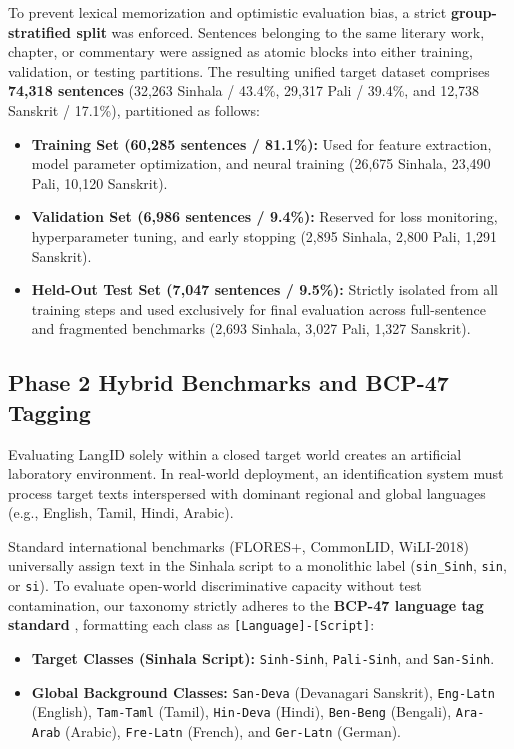\documentclass[11pt]{article}
\begin{document}
To prevent lexical memorization and optimistic evaluation bias, a strict \textbf{group-stratified split} was enforced. Sentences belonging to the same literary work, chapter, or commentary were assigned as atomic blocks into either training, validation, or testing partitions. The resulting unified target dataset comprises \textbf{74,318 sentences} (32,263 Sinhala / 43.4\%, 29,317 Pali / 39.4\%, and 12,738 Sanskrit / 17.1\%), partitioned as follows:
\begin{itemize}
    \item \textbf{Training Set (60,285 sentences / 81.1\%):} Used for feature extraction, model parameter optimization, and neural training (26,675 Sinhala, 23,490 Pali, 10,120 Sanskrit).
    \item \textbf{Validation Set (6,986 sentences / 9.4\%):} Reserved for loss monitoring, hyperparameter tuning, and early stopping (2,895 Sinhala, 2,800 Pali, 1,291 Sanskrit).
    \item \textbf{Held-Out Test Set (7,047 sentences / 9.5\%):} Strictly isolated from all training steps and used exclusively for final evaluation across full-sentence and fragmented benchmarks (2,693 Sinhala, 3,027 Pali, 1,327 Sanskrit).
\end{itemize}

\subsection{Phase 2 Hybrid Benchmarks and BCP-47 Tagging}
Evaluating LangID solely within a closed target world creates an artificial laboratory environment. In real-world deployment, an identification system must process target texts interspersed with dominant regional and global languages (e.g., English, Tamil, Hindi, Arabic).

Standard international benchmarks (FLORES+, CommonLID, WiLI-2018) universally assign text in the Sinhala script to a monolithic label (\texttt{sin\_Sinh}, \texttt{sin}, or \texttt{si}). To evaluate open-world discriminative capacity without test contamination, our taxonomy strictly adheres to the \textbf{BCP-47 language tag standard} \cite{phillips2009tags}, formatting each class as \texttt{[Language]-[Script]}:
\begin{itemize}
    \item \textbf{Target Classes (Sinhala Script):} \texttt{Sinh-Sinh}, \texttt{Pali-Sinh}, and \texttt{San-Sinh}.
    \item \textbf{Global Background Classes:} \texttt{San-Deva} (Devanagari Sanskrit), \texttt{Eng-Latn} (English), \texttt{Tam-Taml} (Tamil), \texttt{Hin-Deva} (Hindi), \texttt{Ben-Beng} (Bengali), \texttt{Ara-Arab} (Arabic), \texttt{Fre-Latn} (French), and \texttt{Ger-Latn} (German).
\end{itemize}
\end{document}
